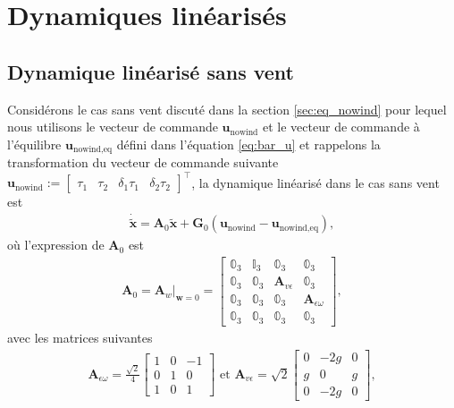 \section{Dynamiques linéarisés}
\subsection{Dynamique linéarisé sans vent}
Considérons le cas sans vent discuté dans la section \ref{sec:eq_nowind} pour lequel nous utilisons le vecteur de commande $\boldsymbol{u}_{\text{nowind}}$  et le vecteur de commande à l'équilibre $\boldsymbol{u}_{\text{nowind},\text{eq}}$ défini dans l'équation \eqref{eq:bar_u} et rappelons la transformation du vecteur de commande suivante $ \boldsymbol{u}_{\text{nowind}} := \begin{bmatrix}\tau_{1}  \!&\! \tau_{2}  \!&\! \delta_{1}\tau_{1} \!&\! \delta_{2}\tau_{2} \end{bmatrix}^\top$, la dynamique linéarisé dans le cas sans vent est 
\begin{align}
    \label{eq:linearized}
     \boldsymbol{\dot{\tilde{x}}} = \boldsymbol{A}_{0} \tilde{\boldsymbol{x}} + \boldsymbol{G}_{0} (\boldsymbol{u}_{\text{nowind}}-\boldsymbol{u}_{\text{nowind},\text{eq}}),
\end{align}
où l'expression de $\boldsymbol{A}_{0}$ est
\begin{align}
    \label{matrice_A}
        \boldsymbol{A}_{0} = \boldsymbol{A}_{w} \Big|_{\boldsymbol{w}=0} =\begin{bmatrix}
        \mathbb{0}_{3} & \mathbb{I}_{3} & \mathbb{0}_{3} & \mathbb{0}_{3} \\
        \mathbb{0}_{3} & \mathbb{0}_{3} &  \boldsymbol{A}_{v\epsilon} & \mathbb{0}_{3} \\
        \mathbb{0}_{3} & \mathbb{0}_{3} & \mathbb{0}_{3} & \boldsymbol{A}_{\epsilon\omega} \\
        \mathbb{0}_{3} & \mathbb{0}_{3} & \mathbb{0}_{3} & \mathbb{0}_{3}
        \end{bmatrix},
\end{align}
avec les matrices suivantes
\begin{align*}
    \boldsymbol{A}_{\epsilon\omega} = \frac{\sqrt{2}}{4}\begin{bmatrix} 
        1 & 0 & -1 \\ 
        0 & 1 & 0  \\
       1 & 0 & 1
    \end{bmatrix} \text{ et } \boldsymbol{A}_{ v\epsilon} = \sqrt{2}\begin{bmatrix} 
        0 & -2g & 0\\
        g & 0 & g  \\ 
         0 & -2g & 0 \end{bmatrix},
\end{align*}
